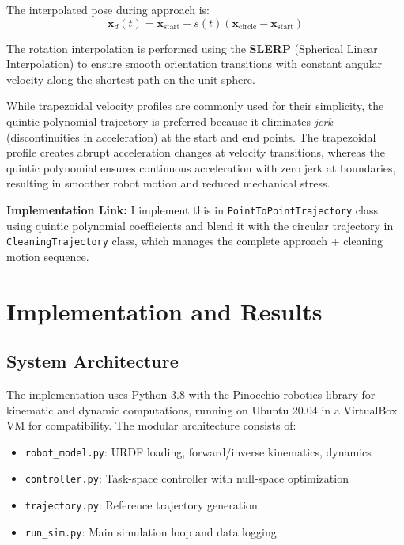 \documentclass[journal,10pt,twocolumn]{IEEEtran}
\begin{document}
The interpolated pose during approach is:
\begin{equation}
\mathbf{x}_d(t) = \mathbf{x}_{\text{start}} + s(t) (\mathbf{x}_{\text{circle}} - \mathbf{x}_{\text{start}})
\end{equation}

The rotation interpolation is performed using the \textbf{SLERP} (Spherical Linear Interpolation) to ensure smooth orientation transitions with constant angular velocity along the shortest path on the unit sphere.

While trapezoidal velocity profiles are commonly used for their simplicity, the quintic polynomial trajectory is preferred because it eliminates \textit{jerk} (discontinuities in acceleration) at the start and end points. The trapezoidal profile creates abrupt acceleration changes at velocity transitions, whereas the quintic polynomial ensures continuous acceleration with zero jerk at boundaries, resulting in smoother robot motion and reduced mechanical stress.

\textbf{Implementation Link:} I implement this in \texttt{PointToPointTrajectory} class using quintic polynomial coefficients and blend it with the circular trajectory in \texttt{CleaningTrajectory} class, which manages the complete approach + cleaning motion sequence.

\section{Implementation and Results}

\subsection{System Architecture}
The implementation uses Python 3.8 with the Pinocchio robotics library for kinematic and dynamic computations, running on Ubuntu 20.04 in a VirtualBox VM for compatibility. The modular architecture consists of:

\begin{itemize}
	\item \texttt{robot\_model.py}: URDF loading, forward/inverse kinematics, dynamics
	\item \texttt{controller.py}: Task-space controller with null-space optimization
	\item \texttt{trajectory.py}: Reference trajectory generation
	\item \texttt{run\_sim.py}: Main simulation loop and data logging
\end{itemize}
\end{document}
